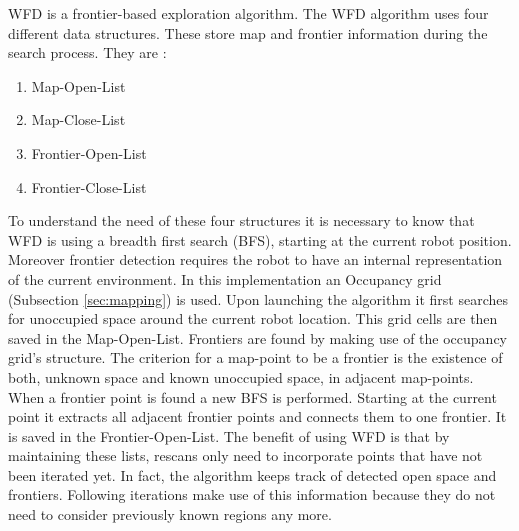 \documentclass{ba-kecs}
\begin{document}
WFD is a frontier-based exploration algorithm. The WFD algorithm uses four different data structures. These store map and frontier information during the search process. They are :
\begin{enumerate}
\item{Map-Open-List}
\item{Map-Close-List}
\item{Frontier-Open-List}
\item{Frontier-Close-List}
\end{enumerate}
To understand the need of these four structures it is necessary to know that WFD is using a breadth first search (BFS), starting at the current robot position. Moreover frontier detection requires the robot to have an internal representation of the current environment. In this implementation an Occupancy grid (Subsection \ref{sec:mapping}) is used.
Upon launching the algorithm it first searches for unoccupied space around the current robot location. This grid cells are then saved in the Map-Open-List. 
Frontiers are found by making use of the occupancy grid's structure. The criterion for a map-point to be a frontier is the existence of both, unknown space and known unoccupied space, in adjacent map-points. When a frontier point is found a new BFS is performed. Starting at the current point it extracts all adjacent frontier points and connects them to one frontier. It is saved in the Frontier-Open-List. The benefit of using WFD is that by maintaining these lists, rescans only need to incorporate points that have not been iterated yet. In fact, the algorithm keeps track of detected open space and frontiers. Following iterations make use of this information because they do not need to consider previously known regions any more.
 
\end{document}
